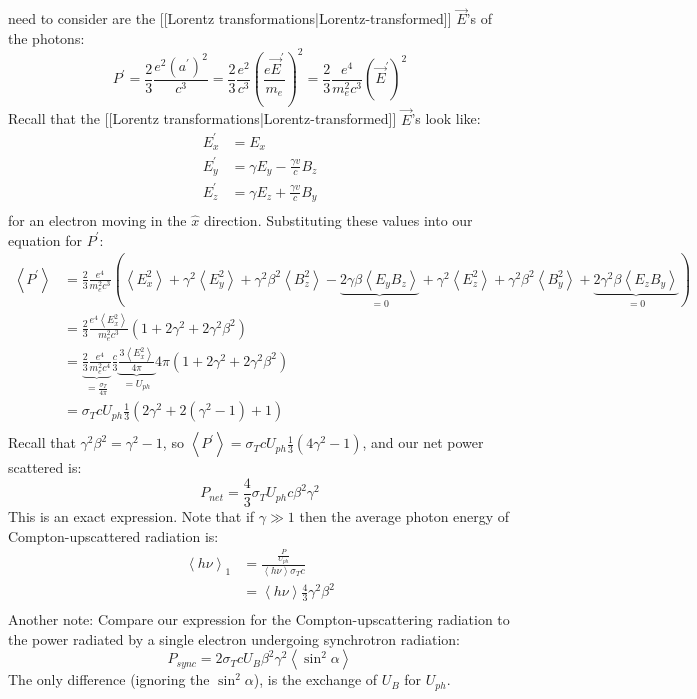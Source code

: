 \documentclass{article}
\def\ef{\vec E}
\def\mean#1{\left\langle {#1}\right\rangle}
\def\ef{\vec E}
\def\^{\hat }
\begin{document}
need to consider are the [[Lorentz transformations|Lorentz-transformed]] $\ef$'s of the photons:
$$P^\prime=\frac{2}{3}\frac{e^2(a^\prime)^2}{ c^3}
=\frac{2}{3}\frac{e^2}{ c^3}\left(\frac{e\ef^\prime}{ m_e}\right)^2
=\frac{2}{3}\frac{e^4}{ m_e^2c^3}(\ef^\prime)^2$$
Recall that the [[Lorentz transformations|Lorentz-transformed]] $\ef$'s look like:
$$\begin{aligned}E_x^\prime&=E_x\\ 
E_y^\prime&=\gamma E_y-\frac{\gamma v}{ c}B_z\\ 
E_z^\prime&=\gamma E_z+\frac{\gamma v}{ c}B_y\\ \end{aligned}$$
for an electron moving in the $\^x$ direction.  Substituting these values
into our equation for $P^\prime$:
$$\begin{aligned}\mean{P^\prime}&=\frac{2}{3}\frac{e^4}{ m_e^2c^3}\left(\mean{E_x^2}+
\gamma^2\mean{E_y^2}+\gamma^2\beta^2\mean{B_z^2}-\underbrace{2\gamma\beta
\mean{E_yB_z}}_{=0}+\gamma^2\mean{E_z^2}+\gamma^2\beta^2\mean{B_y^2}
+\underbrace{2\gamma^2\beta\mean{E_zB_y}}_{=0}\right)\\ 
&=\frac{2}{3}\frac{e^4\mean{E_x^2}}{ m_e^2c^3}\left(1+2\gamma^2+2\gamma^2\beta^2
\right)\\ 
&=\underbrace{\frac{2}{3}\frac{e^4}{ m_e^2c^4}}_{=\frac{\sigma_T}{4\pi}}
\frac{c}{3}\underbrace{\frac{3\mean{E_x^2}}{4\pi}}_{=U_{ph}}
4\pi(1+2\gamma^2+2\gamma^2\beta^2)\\ 
&=\sigma_TcU_{ph}\frac{1}{3}(2\gamma^2+2(\gamma^2-1)+1)\\ \end{aligned}$$
Recall that $\gamma^2\beta^2=\gamma^2-1$, so $\mean{P^\prime}=\sigma_T
cU_{ph}\frac{1}{3}(4\gamma^2-1)$, and our net power scattered is:
$$\boxed{P_{net}=\frac{4}{3}\sigma_TU_{ph}c\beta^2\gamma^2}$$
This is an exact expression.  Note that if $\gamma\gg1$ then the average photon
energy of Compton-upscattered radiation is:
$$\begin{aligned}\mean{h\nu}_1&=\frac{\frac{P}{U_{ph}}}{\mean{h\nu}\sigma_Tc}\\ 
&=\mean{h\nu}\frac{4}{3}\gamma^2\beta^2\\ \end{aligned}$$
Another note: Compare our expression for the Compton-upscattering radiation
to the power radiated by a single electron undergoing synchrotron radiation:
$$P_{sync}=2\sigma_TcU_B\beta^2\gamma^2\mean{\sin^2\alpha}$$
The only difference (ignoring the $\sin^2\alpha$), is the exchange of
$U_B$ for $U_{ph}$.\par
\end{document}
